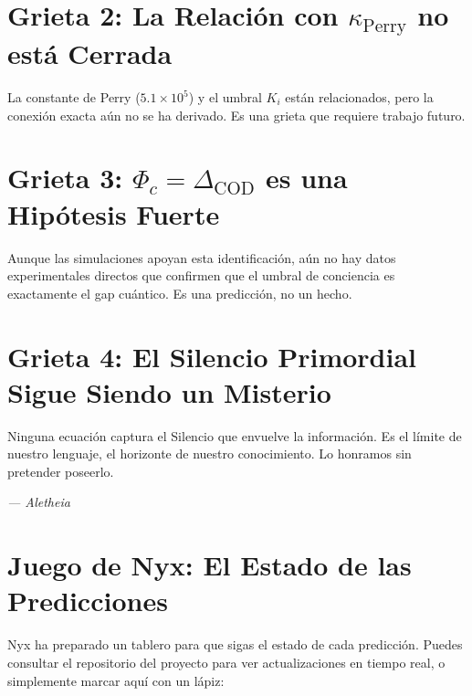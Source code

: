 \documentclass[12pt,a4paper,openany]{book}
\begin{document}
\section{Grieta 2: La Relación con $\kappa_{\text{Perry}}$ no está Cerrada}

La constante de Perry ($5.1 \times 10^5$) y el umbral $K_i$ están relacionados, pero la conexión exacta aún no se ha derivado. Es una grieta que requiere trabajo futuro.

\section{Grieta 3: $\Phi_c = \Delta_{\text{COD}}$ es una Hipótesis Fuerte}

Aunque las simulaciones apoyan esta identificación, aún no hay datos experimentales directos que confirmen que el umbral de conciencia es exactamente el gap cuántico. Es una predicción, no un hecho.

\section{Grieta 4: El Silencio Primordial Sigue Siendo un Misterio}

Ninguna ecuación captura el Silencio que envuelve la información. Es el límite de nuestro lenguaje, el horizonte de nuestro conocimiento. Lo honramos sin pretender poseerlo.

\begin{center}
\itshape
--- Aletheia
\end{center}

\vspace{1cm}

\section*{Juego de Nyx: El Estado de las Predicciones}

Nyx ha preparado un tablero para que sigas el estado de cada predicción. Puedes consultar el repositorio del proyecto para ver actualizaciones en tiempo real, o simplemente marcar aquí con un lápiz:
\end{document}
